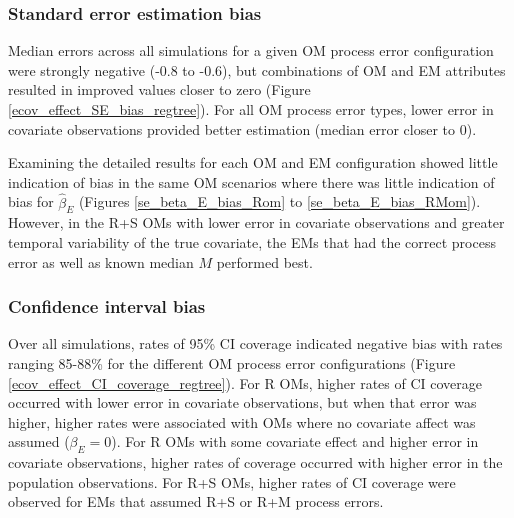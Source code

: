 \documentclass[
  12pt,
]{article}
\begin{document}
\subsubsection*{Standard error estimation
bias}\label{standard-error-estimation-bias-1}

Median errors across all simulations for a given OM process error
configuration were strongly negative (-0.8 to -0.6), but combinations of
OM and EM attributes resulted in improved values closer to zero (Figure
\ref{ecov_effect_SE_bias_regtree}). For all OM process error types,
lower error in covariate observations provided better estimation (median
error closer to 0).

Examining the detailed results for each OM and EM configuration showed
little indication of bias in the same OM scenarios where there was
little indication of bias for \(\widehat \beta_E\) (Figures
\ref{se_beta_E_bias_Rom} to \ref{se_beta_E_bias_RMom}). However, in the
R+S OMs with lower error in covariate observations and greater temporal
variability of the true covariate, the EMs that had the correct process
error as well as known median \(M\) performed best.

\subsubsection*{Confidence interval
bias}\label{confidence-interval-bias-1}

Over all simulations, rates of 95\% CI coverage indicated negative bias
with rates ranging 85-88\% for the different OM process error
configurations (Figure \ref{ecov_effect_CI_coverage_regtree}). For R
OMs, higher rates of CI coverage occurred with lower error in covariate
observations, but when that error was higher, higher rates were
associated with OMs where no covariate affect was assumed
(\(\beta_E = 0\)). For R OMs with some covariate effect and higher error
in covariate observations, higher rates of coverage occurred with higher
error in the population observations. For R+S OMs, higher rates of CI
coverage were observed for EMs that assumed R+S or R+M process errors.
\end{document}
